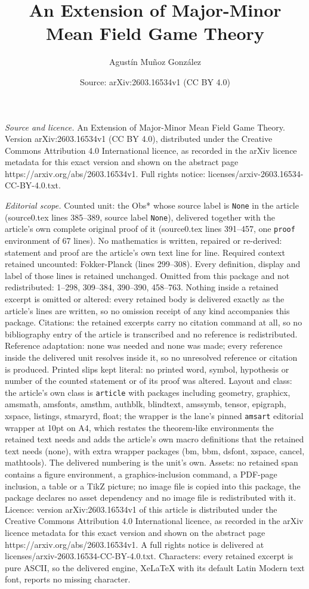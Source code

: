 \documentclass[10pt,a4paper]{amsart}
\title[An Extension of Major-Minor Mean Field Game Theory]{An Extension of Major-Minor Mean Field Game Theory}
\author{Agust\'in Mu\~noz Gonz\'alez}
\date{Source: arXiv:2603.16534v1 (CC BY 4.0)}
\begin{document}
\maketitle

\noindent\emph{Source and licence.} An Extension of Major-Minor Mean Field Game Theory. Version arXiv:2603.16534v1 (CC BY 4.0), distributed under the Creative Commons Attribution 4.0 International licence, as recorded in the arXiv licence metadata for this exact version and shown on the abstract page https://arxiv.org/abs/2603.16534v1. Full rights notice: licenses/arxiv-2603.16534-CC-BY-4.0.txt.\par\smallskip

\noindent\textit{Editorial scope.} Counted unit: the Obs* whose source label is \texttt{None} in the article (source0.tex lines 385--389, source label \texttt{None}), delivered together with the article's own complete original proof of it (source0.tex lines 391--457, one \texttt{proof} environment of 67 lines). No mathematics is written, repaired or re-derived: statement and proof are the article's own text line for line. Required context retained uncounted: Fokker-Planck (lines 299--308). Every definition, display and label of those lines is retained unchanged. Omitted from this package and not redistributed: 1--298, 309--384, 390--390, 458--763. Nothing inside a retained excerpt is omitted or altered: every retained body is delivered exactly as the article's lines are written, so no omission receipt of any kind accompanies this package. Citations: the retained excerpts carry no citation command at all, so no bibliography entry of the article is transcribed and no reference is redistributed. Reference adaptation: none was needed and none was made; every reference inside the delivered unit resolves inside it, so no unresolved reference or citation is produced. Printed slips kept literal: no printed word, symbol, hypothesis or number of the counted statement or of its proof was altered. Layout and class: the article's own class is \texttt{article} with packages including geometry, graphicx, amsmath, amsfonts, amsthm, authblk, blindtext, amssymb, tensor, epigraph, xspace, listings, stmaryrd, float; the wrapper is the lane's pinned \texttt{amsart} editorial wrapper at 10pt on A4, which restates the theorem-like environments the retained text needs and adds the article's own macro definitions that the retained text needs (none), with extra wrapper packages (bm, bbm, dsfont, xspace, cancel, mathtools). The delivered numbering is the unit's own. Assets: no retained span contains a figure environment, a graphics-inclusion command, a PDF-page inclusion, a table or a TikZ picture; no image file is copied into this package, the package declares no asset dependency and no image file is redistributed with it. Licence: version arXiv:2603.16534v1 of this article is distributed under the Creative Commons Attribution 4.0 International licence, as recorded in the arXiv licence metadata for this exact version and shown on the abstract page https://arxiv.org/abs/2603.16534v1. A full rights notice is delivered at licenses/arxiv-2603.16534-CC-BY-4.0.txt. Characters: every retained excerpt is pure ASCII, so the delivered engine, XeLaTeX with its default Latin Modern text font, reports no missing character.
\end{document}
